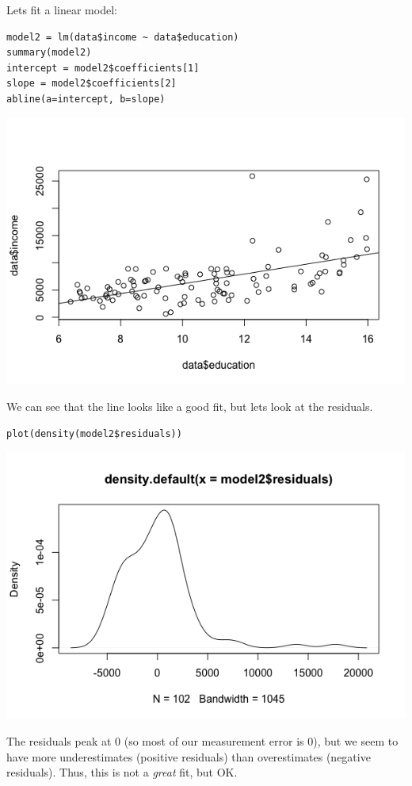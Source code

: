 \documentclass[11pt]{article}
\begin{document}
Lets fit a linear model:

\begin{verbatim}
model2 = lm(data$income ~ data$education)
summary(model2)
intercept = model2$coefficients[1]
slope = model2$coefficients[2]
abline(a=intercept, b=slope)
\end{verbatim}

\includegraphics[width=.9\linewidth]{figures/week7/incomeFitted.png}

We can see that the line looks like a good fit, but lets look at the residuals.

\begin{verbatim}
plot(density(model2$residuals))
\end{verbatim}

\includegraphics[width=.9\linewidth]{figures/week7/incomeResiduals.png}

The residuals peak at 0 (so most of our measurement error is 0), but we seem to have more underestimates (positive residuals) than overestimates (negative residuals).  Thus, this is not a \emph{great} fit, but OK.
\end{document}
